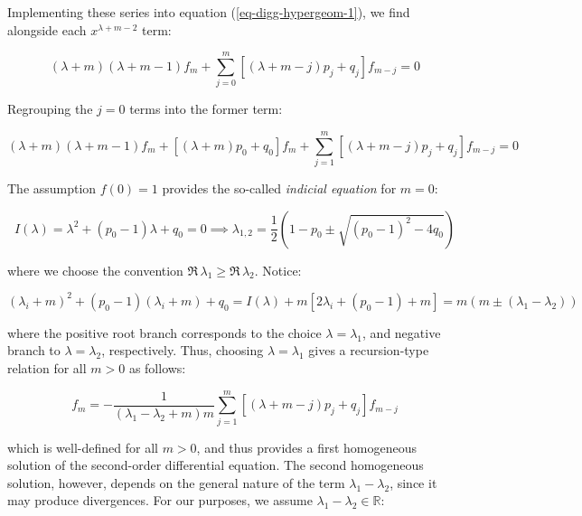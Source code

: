 Implementing these series into equation (\ref{eq-digg-hypergeom-1}), we find alongside each $x^{\lambda+m-2}$ term:

\begin{equation}
    (\lambda+m)(\lambda+m-1)f_m+\sum_{j=0}^m\left[(\lambda+m-j)p_j+q_j\right]f_{m-j}=0
\end{equation}

Regrouping the $j=0$ terms into the former term:

\begin{equation}
    \label{eq-6-96xx}
    (\lambda+m)(\lambda+m-1)f_m+\left[(\lambda+m)p_0+q_0\right]f_m+\sum_{j=1}^m\left[(\lambda+m-j)p_j+q_j\right]f_{m-j}=0
\end{equation}

The assumption $f(0)=1$ provides the so-called \textit{indicial equation} for $m=0$:

\begin{equation}
    I(\lambda)=\lambda^2+(p_0-1)\lambda+q_0=0\implies\lambda_{1,2}=\frac{1}{2}\left(1-p_0\pm\sqrt{(p_0-1)^2-4q_0}\right)
\end{equation}

where we choose the convention $\Re\,{\lambda_1}\geq\Re\,\lambda_2$. Notice:

\begin{equation}
    (\lambda_i+m)^2+(p_0-1)(\lambda_i+m)+q_0=I(\lambda)+m\left[2\lambda_i+(p_0-1)+m\right]=m(m\pm(\lambda_1-\lambda_2))
\end{equation}

where the positive root branch corresponds to the choice $\lambda=\lambda_1$, and negative branch to $\lambda=\lambda_2$, respectively. Thus, choosing $\lambda=\lambda_1$ gives a recursion-type relation for all $m>0$ as follows:

\begin{equation}
    \label{eq-6-99x}
    f_m=-\frac{1}{(\lambda_1-\lambda_2+m)m}\sum_{j=1}^m\left[(\lambda+m-j)p_j+q_j\right]f_{m-j}
\end{equation}

which is well-defined for all $m>0$, and thus provides a first homogeneous solution of the second-order differential equation. The second homogeneous solution, however, depends on the general nature of the term $\lambda_1-\lambda_2$, since it may produce divergences. For our purposes, we assume $\lambda_1-\lambda_2\in\mathbb{R}$:

